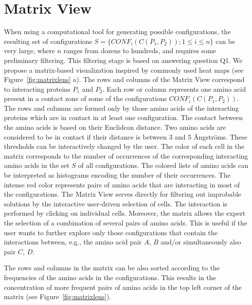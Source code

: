 \documentclass[twocolumn]{bmcart}%
\def\MatView {Matrix View\xspace}
\begin{document}

\section{Matrix View}
When using a computational tool for generating possible configurations, the resulting set of configurations $S = \{CONF_i(C(P_1,P_2)); 1 \leq i \leq n\}$ can be very large, where $n$ ranges from dozens to hundreds, and requires some preliminary filtering.
This filtering stage is based on answering question Q1.
We propose a matrix-based visualization inspired by commonly used heat maps (see Figure~\ref{fig:matrixlens} a).
The rows and columns of the \MatView correspond to interacting proteins $P_1$ and $P_2$.
Each row or column represents one amino acid present in a contact zone of some of the configurations $CONF_i(C(P_1,P_2))$. 
The rows and columns are formed only by those amino acids of the interacting proteins which are in contact in at least one configuration.
The contact between the amino acids is based on their Euclidean distance. 
Two amino acids are considered to be in contact if their distance is between 3 and 5 \AA ngstr\"{o}ms.
These thresholds can be interactively changed by the user.
The color of each cell in the matrix corresponds to the number of occurrences of the corresponding interacting amino acids in the set $S$ of all configurations. 
The colored lists of amino acids can be interpreted as histograms encoding the number of their occurrences.
The intense red color represents pairs of amino acids that are interacting in most of the configurations.
The \MatView serves directly for filtering out improbable solutions by the interactive user-driven selection of cells.
The interaction is performed by clicking on individual cells. 
Moreover, the matrix allows the expert the selection of a combination of several pairs of amino acids.
This is useful if the user wants to further explore only those configurations that contain the interactions between, e.g., the amino acid pair $A$, $B$ and/or simultaneously also pair $C$, $D$. 

The rows and columns in the matrix can be also sorted according to the frequencies of the amino acids in the configurations. 
This results in the concentration of more frequent pairs of amino acids in the top left corner of the matrix (see Figure~\ref{fig:matrixlens}).
\end{document}
